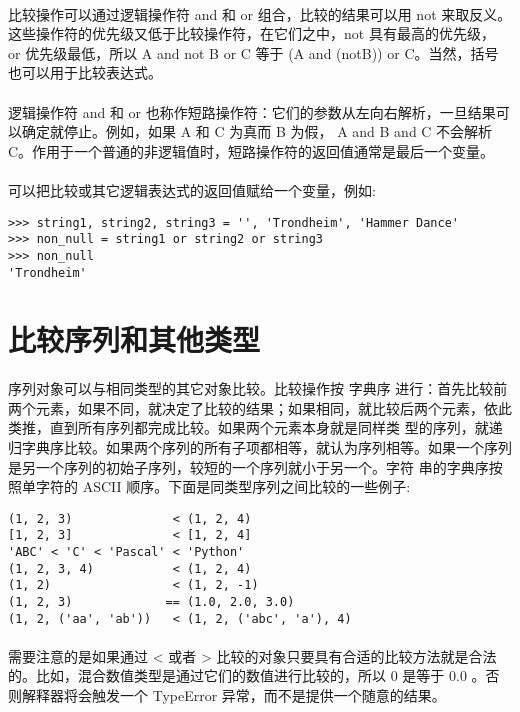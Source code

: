 \documentclass{article}
\begin{document}
\begin{CJK}{UTF8}{gbsn}
\paragraph{}
比较操作可以通过逻辑操作符 and 和 or 组合，比较的结果可以用 not 来取反义。这些操作符的优先级又低于比较操作符，在它们之中，not 具有最高的优先级， or 优先级最低，所以 A and not B or C 等于 (A and (notB)) or C。当然，括号也可以用于比较表达式。
\paragraph{}
逻辑操作符 and 和 or 也称作短路操作符：它们的参数从左向右解析，一旦结果可以确定就停止。例如，如果 A 和 C 为真而 B 为假， A and B and C 不会解析 C。作用于一个普通的非逻辑值时，短路操作符的返回值通常是最后一个变量。
\paragraph{}
可以把比较或其它逻辑表达式的返回值赋给一个变量，例如:
\begin{verbatim}
>>> string1, string2, string3 = '', 'Trondheim', 'Hammer Dance'
>>> non_null = string1 or string2 or string3
>>> non_null
'Trondheim'
\end{verbatim}
\section{比较序列和其他类型}
\paragraph{}
序列对象可以与相同类型的其它对象比较。比较操作按 字典序 进行：首先比较前两个元素，如果不同，就决定了比较的结果；如果相同，就比较后两个元素，依此类推，直到所有序列都完成比较。如果两个元素本身就是同样类 型的序列，就递归字典序比较。如果两个序列的所有子项都相等，就认为序列相等。如果一个序列是另一个序列的初始子序列，较短的一个序列就小于另一个。字符 串的字典序按照单字符的 ASCII 顺序。下面是同类型序列之间比较的一些例子:
\begin{verbatim}
(1, 2, 3)              < (1, 2, 4)
[1, 2, 3]              < [1, 2, 4]
'ABC' < 'C' < 'Pascal' < 'Python'
(1, 2, 3, 4)           < (1, 2, 4)
(1, 2)                 < (1, 2, -1)
(1, 2, 3)             == (1.0, 2.0, 3.0)
(1, 2, ('aa', 'ab'))   < (1, 2, ('abc', 'a'), 4)
\end{verbatim}
\paragraph{}
需要注意的是如果通过 < 或者 > 比较的对象只要具有合适的比较方法就是合法的。比如，混合数值类型是通过它们的数值进行比较的，所以 0 是等于 0.0 。否则解释器将会触发一个 TypeError 异常，而不是提供一个随意的结果。

\end{CJK}
\end{document}
